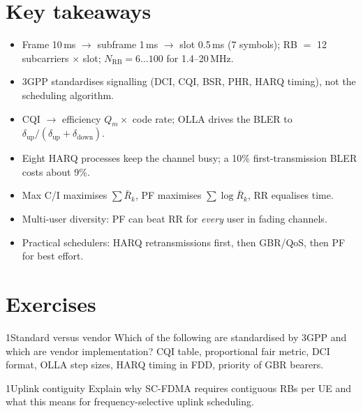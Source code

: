 \documentclass[11pt,a4paper]{article}
\begin{document}
\section{Key takeaways}
\begin{takeawaybox}
\begin{itemize}
  \item Frame 10\,ms $\to$ subframe 1\,ms $\to$ slot 0.5\,ms (7 symbols); RB $=$ 12 subcarriers $\times$ slot;
        $N_{\mathrm{RB}} = 6\dots100$ for 1.4--20\,MHz.
  \item 3GPP standardises signalling (DCI, CQI, BSR, PHR, HARQ timing), not the scheduling algorithm.
  \item CQI $\to$ efficiency $Q_m\times$ code rate; OLLA drives the BLER to $\delta_{\mathrm{up}}/(\delta_{\mathrm{up}}+\delta_{\mathrm{down}})$.
  \item Eight HARQ processes keep the channel busy; a 10\% first-transmission BLER costs about 9\%.
  \item Max C/I maximises $\sum \bar R_k$, PF maximises $\sum\log\bar R_k$, RR equalises time.
  \item Multi-user diversity: PF can beat RR for \emph{every} user in fading channels.
  \item Practical schedulers: HARQ retransmissions first, then GBR/QoS, then PF for best effort.
\end{itemize}
\end{takeawaybox}

\section{Exercises}

\begin{exercisebox}{1}{Standard versus vendor}\label{exr:std}
Which of the following are standardised by 3GPP and which are vendor implementation? CQI table,
proportional fair metric, DCI format, OLLA step sizes, HARQ timing in FDD, priority of GBR bearers.
\end{exercisebox}

\begin{exercisebox}{1}{Uplink contiguity}\label{exr:contig}
Explain why SC-FDMA requires contiguous RBs per UE and what this means for frequency-selective
uplink scheduling.
\end{exercisebox}
\end{document}
